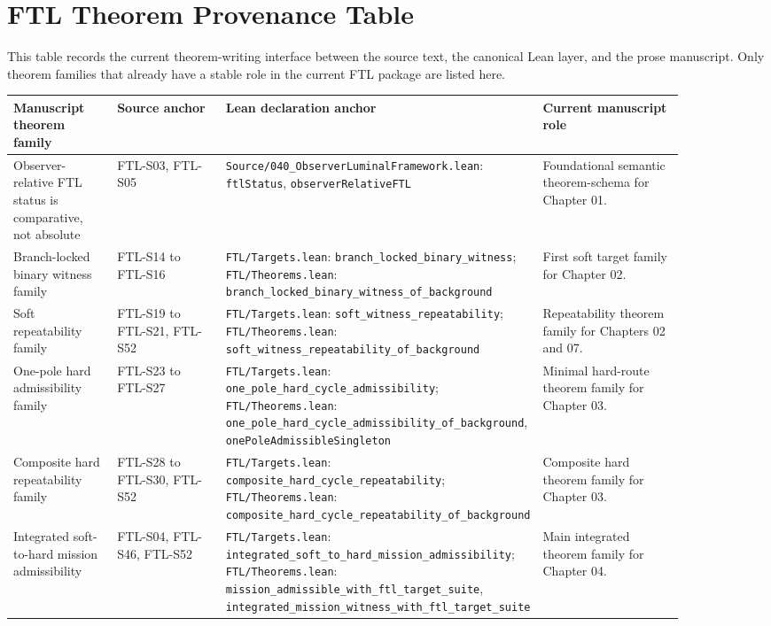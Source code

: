 \section*{FTL Theorem Provenance Table}

This table records the current theorem-writing interface between the source text, the canonical Lean layer, and the prose manuscript. Only theorem families that already have a stable role in the current FTL package are listed here.

\begin{longtable}{p{0.18\linewidth}p{0.23\linewidth}p{0.19\linewidth}p{0.28\linewidth}}
\toprule
\textbf{Manuscript theorem family} & \textbf{Source anchor} & \textbf{Lean declaration anchor} & \textbf{Current manuscript role} \\
\midrule
\endhead
Observer-relative FTL status is comparative, not absolute & FTL-S03, FTL-S05 & \texttt{Source/040\_ObserverLuminalFramework.lean}: \texttt{ftlStatus}, \texttt{observerRelativeFTL} & Foundational semantic theorem-schema for Chapter 01. \\
Branch-locked binary witness family & FTL-S14 to FTL-S16 & \texttt{FTL/Targets.lean}: \texttt{branch\_locked\_binary\_witness}; \texttt{FTL/Theorems.lean}: \texttt{branch\_locked\_binary\_witness\_of\_background} & First soft target family for Chapter 02. \\
Soft repeatability family & FTL-S19 to FTL-S21, FTL-S52 & \texttt{FTL/Targets.lean}: \texttt{soft\_witness\_repeatability}; \texttt{FTL/Theorems.lean}: \texttt{soft\_witness\_repeatability\_of\_background} & Repeatability theorem family for Chapters 02 and 07. \\
One-pole hard admissibility family & FTL-S23 to FTL-S27 & \texttt{FTL/Targets.lean}: \texttt{one\_pole\_hard\_cycle\_admissibility}; \texttt{FTL/Theorems.lean}: \texttt{one\_pole\_hard\_cycle\_admissibility\_of\_background}, \texttt{onePoleAdmissibleSingleton} & Minimal hard-route theorem family for Chapter 03. \\
Composite hard repeatability family & FTL-S28 to FTL-S30, FTL-S52 & \texttt{FTL/Targets.lean}: \texttt{composite\_hard\_cycle\_repeatability}; \texttt{FTL/Theorems.lean}: \texttt{composite\_hard\_cycle\_repeatability\_of\_background} & Composite hard theorem family for Chapter 03. \\
Integrated soft-to-hard mission admissibility & FTL-S04, FTL-S46, FTL-S52 & \texttt{FTL/Targets.lean}: \texttt{integrated\_soft\_to\_hard\_mission\_admissibility}; \texttt{FTL/Theorems.lean}: \texttt{mission\_admissible\_with\_ftl\_target\_suite}, \texttt{integrated\_mission\_witness\_with\_ftl\_target\_suite} & Main integrated theorem family for Chapter 04. \\

\end{longtable}
